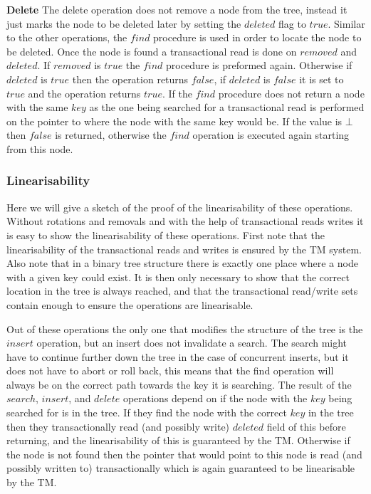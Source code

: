 \documentclass[10pt]{sigplanconf}
\begin{document}
{\bf Delete} The delete operation does not remove a node from the tree, instead it just marks the node to be deleted later by setting the $deleted$ flag to $true$.
Similar to the other operations, the $find$ procedure is used in order to locate the node to be deleted.
Once the node is found a transactional read is done on $removed$ and $deleted$.
If $removed$ is $true$ the $find$ procedure is preformed again.
Otherwise if $deleted$ is $true$ then the operation returns $false$, if $deleted$ is $false$ it is set to $true$ and the operation returns $true$.
If the $find$ procedure does not return a node with the same $key$ as the one being searched for a transactional read is performed on the pointer to where the node with the same key would be.
If the value is $\bot$ then $false$ is returned, otherwise the $find$ operation is executed again starting from this node.

\subsubsection{Linearisability}
Here we will give a sketch of the proof of the linearisability of these operations.
Without rotations and removals and with the help of transactional reads writes it is easy to show the linearisability of these operations.
First note that the linearisability of the transactional reads and writes is ensured by the TM system.
Also note that in a binary tree structure there is exactly one place where a node with a given key could exist.
It is then only necessary to show that the correct location in the tree is always reached, and that the transactional read/write sets contain enough to ensure the operations are linearisable.

Out of these operations the only one that modifies the structure of the tree is the $insert$ operation, but an insert does not invalidate a search.
The search might have to continue further down the tree in the case of concurrent inserts, but it does not have to abort or roll back, this means that the find operation will always be on the correct path towards the key it is searching.
The result of the $search$, $insert$, and $delete$ operations depend on if the node with the $key$ being searched for is in the tree.
If they find the node with the correct $key$ in the tree then they transactionally read (and possibly write) $deleted$ field of this before returning, and the linearisability of this is guaranteed by the TM.
Otherwise if the node is not found then the pointer that would point to this node is read (and possibly written to) transactionally which is again guaranteed to be linearisable by the TM.
\end{document}

